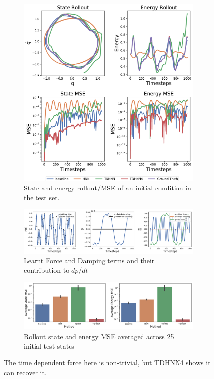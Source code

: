\documentclass[twoside]{article}
\begin{document}
\begin{figure}[h!]
\captionsetup{justification=centering}
	\begin{subfigure}[b]{0.4\textwidth}
		\centering
		\includegraphics[width=\textwidth]{figures/forced_mass_spring_2.pdf}
		\caption{State and energy rollout/MSE of an initial condition in the test set.}
	\end{subfigure}
	\begin{subfigure}[b]{0.48\textwidth}
		\centering
		\includegraphics[width=\textwidth]{figures/dpdt_forced_mass_spring_2.pdf}
		\caption{Learnt Force and Damping terms and their contribution to $dp/dt$}
	\end{subfigure}
	\begin{subfigure}[b]{0.48\textwidth}
	    \centering
		\includegraphics[width=\textwidth]{figures/mass_spring_forced_2_errors.pdf}
		\caption{Rollout state and energy MSE averaged across 25 initial test states}
	\end{subfigure}
\caption{The time dependent force here is non-trivial, but TDHNN4 shows it can recover it.}
\label{fig.fmspring2}
\end{figure}
\end{document}
